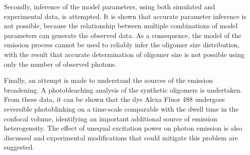 Secondly, inference of the model parameters, using both simulated and experimental data, is attempted. It is shown that accurate parameter inference is not possible, because the relationship between multiple combinations of model parameters can generate the observed data. As a consequence, the model of the emission process cannot be used to reliably infer the oligomer size distribution, with the result that accurate determination of oligomer size is not possible using only the number of observed photons.

Finally, an attempt is made to understand the sources of the emission broadening. A photobleaching analysis of the synthetic oligomers is undertaken. From these data, it can be shown that the dye Alexa Fluor 488 undergoes reversible photoblinking on a time-scale comparable with the dwell time in the confocal volume, identifying an important additional source of emission heterogeneity. The effect of unequal excitation power on photon emission is also discussed and experimental modifications that could mitigate this problem are suggested. 

%



